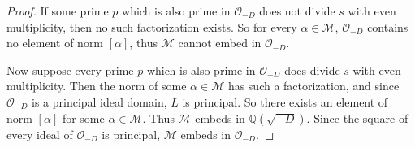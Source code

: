 \documentclass[a4paper]{article}
\theoremstyle{plain}
\theoremstyle{definition}
\newcommand{\thering}
{
\mathcal{O}_{-D}
}
\newcommand{\thefield}
{
\mathbb{Q}(\sqrt{-D})
}
\newcommand{\M}
{
\mathcal{M}
}
\newcommand{\norm}[1]
{
\left[ #1 \right]
}
\begin{document}
\begin{proof}
If some prime $p$ which is also prime in $\thering$ does not divide $s$ with even multiplicity, then no such factorization exists.  So for every $\alpha \in \M$, $\thering$ contains no element of norm $\norm{\alpha}$, thus $\M$ cannot embed in $\thering$.

Now suppose every prime $p$ which is also prime in $\thering$ does divide $s$ with even multiplicity.  Then the norm of some $\alpha \in \M$ has such a factorization, and since $\thering$ is a principal ideal domain, $L$ is principal.  So there exists an element of norm $\norm{\alpha}$ for some $\alpha \in \M$.  Thus $\M$ embeds in $\thefield$.  Since the square of every ideal of $\thering$ is principal, $\M$ embeds in $\thering$.

\end{proof}
\end{document}
